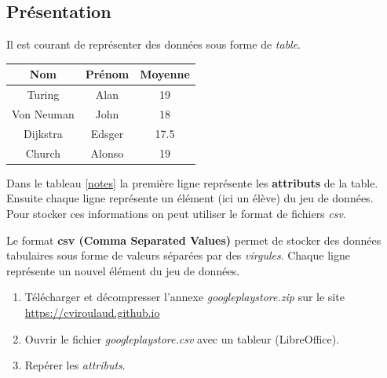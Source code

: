 \documentclass[a4paper,11pt]{article}
\begin{document}
\subsection{Présentation}
Il est courant de représenter des données sous forme de \emph{table}.
\begin{center}
    \begin{tabular}{|*{3}{c|}}
        \hline
        \rowcolor{LightGray} Nom & Prénom & Moyenne \\
        \hline
        Turing                   & Alan   & 19      \\
        \hline
        Von Neuman               & John   & 18      \\
        \hline
        Dijkstra                 & Edsger & 17.5    \\
        \hline
        Church                   & Alonso & 19      \\
        \hline
    \end{tabular}
    \label{notes}
\end{center}
Dans le tableau \ref{notes} la première ligne représente les \textbf{attributs} de la table. Ensuite chaque ligne représente un élément (ici un élève) du jeu de données.\\
Pour stocker ces informations on peut utiliser le format de fichiers \emph{csv}.
\begin{aretenir}[]
    Le format \textbf{csv (Comma Separated Values)} permet de stocker des données tabulaires sous forme de valeurs séparées par des \emph{virgules}. Chaque ligne représente un nouvel élément du jeu de données.
\end{aretenir}
\begin{activite}
    \begin{enumerate}
        \item Télécharger et décompresser l'annexe \emph{googleplaystore.zip} sur le site \url{https://cviroulaud.github.io}
        \item Ouvrir le fichier \emph{googleplaystore.csv} avec un tableur (LibreOffice).
        \item Repérer les \emph{attributs}.
    \end{enumerate}
\end{activite}
\end{document}
